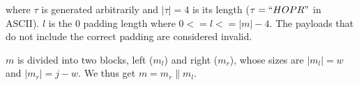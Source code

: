where $\tau$ is generated arbitrarily and $|\tau|=4$ is its length ($\tau=``HOPR "$ in ASCII). $l$ is the $0$ padding length where
$0 <= l <= |m| - 4$. The payloads that do not include the correct padding are considered invalid.

$m$ is divided into two blocks, left ($m_l$) and right ($m_r$), whose sizes are $|m_l|=w$ and $|m_r|=j-w$. We thus get $m=m_r\|m_l$.

